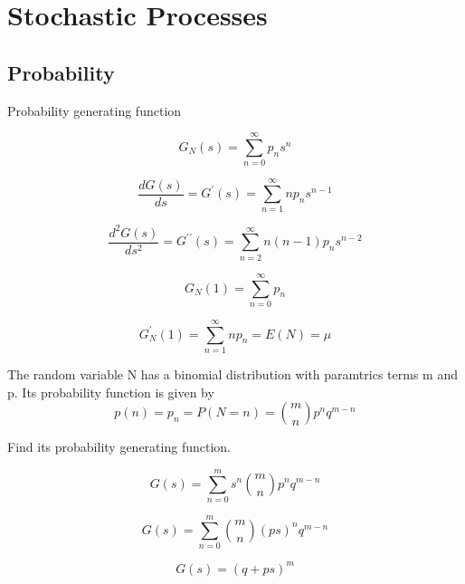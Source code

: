 

\chapter{Stochastic Processes}

\section{Probability}

Probability generating function

\begin{equation}
G_N(s) = \sum_{n=0}^{\infty} p_{n}s^{n}
\end{equation}

\begin{equation}
\frac{dG(s)}{ds} = G^{\prime}(s) = \sum_{n=1}^{\infty}
np_{n}s^{n-1}
\end{equation}


\begin{equation}
\frac{d^2G(s)}{ds^2} = G^{\prime \prime}(s) =
\sum_{n=2}^{\infty}n(n-1)p_{n}s^{n-2}
\end{equation}

\begin{equation}
G_N(1) = \sum_{n=0}^{\infty} p_{n}
\end{equation}

\begin{equation}
G^{\prime}_N(1) = \sum_{n=1}^{\infty} np_{n}=E(N) = \mu
\end{equation}


The random variable N has a binomial distribution with paramtrics
terms m and p. Its probability function is given by
\begin{equation}
p(n) = p_n  = P(N=n) = {m \choose n}p^nq^{m-n}
\end{equation}

Find its probability generating function.

\begin{equation}
G(s) =  \sum_{n=0}^{m} s^n {m \choose n} p^nq^{m-n}
\end{equation}

\begin{equation}
G(s) =  \sum_{n=0}^{m} {m \choose n} (ps)^n q^{m-n}
\end{equation}


\begin{equation}
G(s) =  (q + ps)^m
\end{equation}


